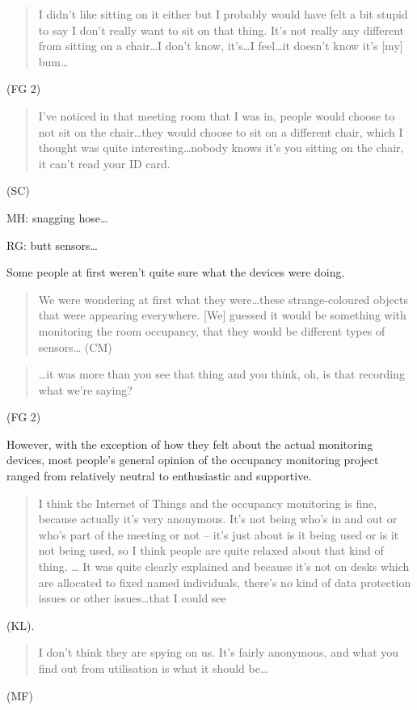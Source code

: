 \begin{quote}I didn’t like sitting on it either but I probably would have felt a
bit stupid to say I don’t really want to sit on that thing. It’s not
really any different from sitting on a chair…I don’t know, it’s…I
feel…it doesn’t know it’s [my] bum…\end{quote} (FG 2)

\begin{quote}I’ve noticed in that meeting room that I was in, people would choose
to not sit on the chair\ldots they would choose to sit on a different
chair, which I thought was quite interesting…nobody knows it’s you
sitting on the chair, it can’t read your ID card.\end{quote} (SC)

MH: snagging hose…

RG: butt sensors\ldots

Some people at first weren’t quite sure what the devices were doing.
\begin{quote}We were wondering at first what they were\ldots these strange-coloured
objects that were appearing everywhere. [We] guessed it would be
something with monitoring the room occupancy, that they would be
different types of sensors… (CM)\end{quote}

\begin{quote}\ldots it was more than you see that thing and you think, oh, is that
recording what we’re saying?\end{quote} (FG 2) 

However, with the exception of how they felt about the actual
monitoring devices, most people’s general opinion of the occupancy
monitoring project ranged from relatively neutral to enthusiastic and
supportive.

\begin{quote}I think the Internet of Things and the occupancy monitoring is fine,
because actually it’s very anonymous. It’s not being who’s in and out
or who’s part of the meeting or not – it’s just about is it being used
or is it not being used, so I think people are quite relaxed about
that kind of thing. … It was quite clearly explained and because it’s
not on desks which are allocated to fixed named individuals, there’s
no kind of data protection issues or other issues\ldots that I could see\end{quote}
(KL).

\begin{quote}I don’t think they are spying on us. It’s fairly anonymous, and what
you find out from utilisation is what it should be…\end{quote} (MF)

